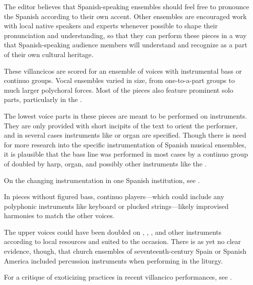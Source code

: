 
The editor believes that Spanish-speaking ensembles should feel free to
pronounce the Spanish according to their own accent.
Other ensembles are encouraged work with local native speakers and experts
whenever possible to shape their pronunciation and understanding, so that they
can perform these pieces in a way that Spanish-speaking audience members will
understand and recognize as a part of their own cultural heritage.

These villancicos are scored for an ensemble of voices with instrumental bass 
or continuo groups.
Vocal ensembles varied in size, from one-to-a-part groups to much larger 
polychoral forces.
Most of the pieces also feature prominent solo parts, particularly in the 
.

The lowest voice parts in these pieces are meant to be performed on instruments. 
They are only provided with short incipits of the text to orient the 
performer, and in several cases instruments like  or organ are specified.
Though there is need for more research into the specific instrumentation of 
Spanish musical ensembles, it is plausible that the bass line was performed in 
most cases by a continuo group of  doubled by harp, organ, and 
possibly other instruments like the .%
\begin{Footnote}
    On the changing instrumentation in one Spanish institution, see 
    \autocite{Torrente:PhD}.
\end{Footnote}
In pieces without figured bass, continuo players---which could include any
polyphonic instruments like keyboard or plucked strings---likely improvised
harmonies to match the other voices.

The upper voices could have been doubled on ,
, , and other instruments
according to local resources and suited to the occasion.
There is as yet no clear evidence, though, that church ensembles of 
seventeenth-century Spain or Spanish America included percussion instruments
when performing in the liturgy.%
\begin{Footnote}
    For a critique of exoticizing practices in recent villancico performances,  
    see \autocites{Baker:PerformancePostColonial}{Davies:LocalContent}.
\end{Footnote}

